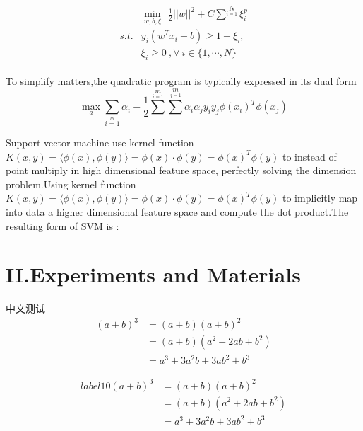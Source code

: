 \documentclass{article}
\begin{document}
\begin{multline}\label{1}
\begin{split}
  &\min \limits_{w,b,\xi} \ \ \frac{1}{2}||w||^2+C\sum^{N} \limits_{i=1}\xi^p_i \\
  s.t. & y_i(w^T x_i + b)\geq 1-\xi_i,\\
       &\xi_i \geq  0 \ ,\forall \ i \in \{1,\cdots,N\}
\end{split}
\end{multline}

To simplify matters,the quadratic program is typically expressed in its dual form
\begin{equation}
\max_a  \sum_{i=1}\limits^{m} \alpha_i - \frac{1}{2} \sum \limits^{m} \limits_{i=1} \sum \limits^{m} \limits_{j=1} \alpha_i \alpha_j y_i y_j \phi(x_i)^T \phi(x_j) \tag{2}
\end{equation}

Support vector machine use kernel function  $K(x,y)= \langle\phi(x) , \phi(y)\rangle =\phi(x) \cdot \phi(y) = \phi(x)^T  \phi(y)$  to instead of point multiply in high dimensional feature space, perfectly solving the dimension problem.Using kernel function $K(x,y)= \langle\phi(x) , \phi(y)\rangle =\phi(x) \cdot \phi(y) = \phi(x)^T  \phi(y)$ to implicitly map into data a higher dimensional feature space and compute the dot product.The resulting form of SVM is :


\section{II.Experiments and Materials}

中文测试
\begin{eqnarray}
      (a + b)^3  &= (a + b) (a + b)^2        \\
             &= (a + b)(a^2 + 2ab + b^2) \\
             &= a^3 + 3a^2b + 3ab^2 + b^3
\end{eqnarray}

\begin{align}label{10}
  (a + b)^3  &= (a + b) (a + b)^2        \\
             &= (a + b)(a^2 + 2ab + b^2) \\
             &= a^3 + 3a^2b + 3ab^2 + b^3
\end{align}
\end{document}
